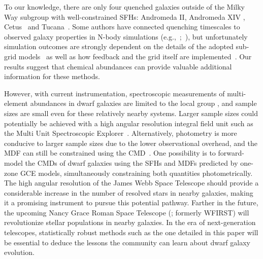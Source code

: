 \documentclass[ms.tex]{subfiles}
\begin{document}
To our knowledge, there are only four quenched galaxies outside of the Milky
Way subgroup with well-constrained SFHs: Andromeda II, Andromeda XIV
\citep{Weisz2014a}, Cetus~\citep{Monelli2010a} and Tucana~\citep{Monelli2010b}.
Some authors have connected quenching timescales to observed galaxy properties
in N-body simulations (e.g.,~\citealp*{Rocha2012};~\citealp{Slater2013,
Slater2014, Phillips2014, Phillips2015, Wheeler2014}), but unfortunately
simulation outcomes are strongly dependent on the details of the adopted
sub-grid models~\citep[e.g.,][]{Li2020} as well as how feedback and the grid
itself are implemented~\citep{Hu2022}.
Our results suggest that chemical abundances can provide valuable additional
information for these methods.
\par
However, with current instrumentation, spectroscopic measurements of
multi-element abundances in dwarf galaxies are limited to the local group
\citep[e.g.,][]{Kirby2011, Kirby2020}, and sample sizes are small even for
these relatively nearby systems.
Larger sample sizes could potentially be achieved with a high
angular resolution integral field unit such as the Multi Unit Spectroscopic
Explorer~\citep[MUSE;][]{Bacon2014}.
Alternatively, photometry is more conducive to larger sample sizes due to the
lower observational overhead, and the MDF can still be constrained using the
CMD~\citep[e.g.,][]{Lianou2011}.
One possibility is to forward-model the CMDs of dwarf galaxies using the SFHs
and MDFs predicted by one-zone GCE models, simultaneously constraining both
quantities photometrically.
The high angular resolution of the James Webb Space Telescope
\citep[JWST;][]{Gardner2006} should provide a considerable increase in the
number of resolved stars in nearby galaxies, making it a promising instrument
to pursue this potential pathway.
Farther in the future, the upcoming Nancy Grace Roman Space Telescope
(\citealp{Spergel2013, Spergel2015}; formerly WFIRST) will revolutionize
stellar populations in nearby galaxies.
In the era of next-generation telescopes, statistically robust methods such as
the one detailed in this paper will be essential to deduce the lessons the
community can learn about dwarf galaxy evolution.
\end{document}
